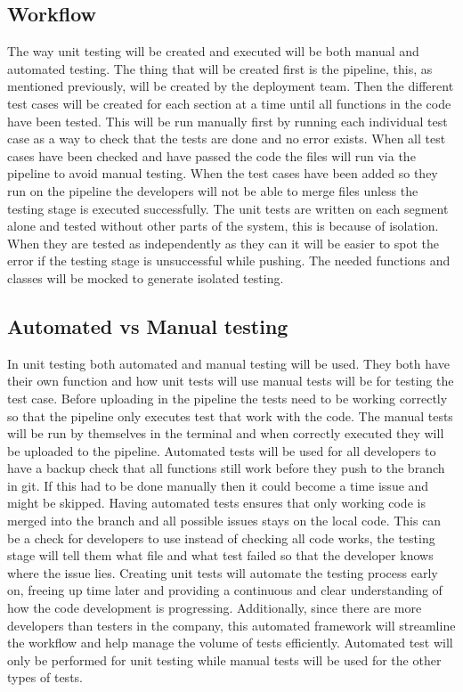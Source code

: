 \documentclass{article}
\begin{document}
\subsection{Workflow}
The way unit testing will be created and executed will be both manual and automated testing. The thing that will be created first is the pipeline, this, as mentioned previously, will be created by the deployment team. Then the different test cases will be created for each section at a time until all functions in the code have been tested. This will be run manually first by running each individual test case as a way to check that the tests are done and no error exists. When all test cases have been checked and have passed the code the files will run via the pipeline to avoid manual testing. When the test cases have been added so they run on the pipeline the developers will not be able to merge files unless the testing stage is executed successfully. The unit tests are written on each segment alone and tested without other parts of the system, this is because of isolation. When they are tested as independently as they can it will be easier to spot the error if the testing stage is unsuccessful while pushing. The needed functions and classes will be mocked to generate isolated testing. 

\subsection{Automated vs Manual testing }
In unit testing both automated and manual testing will be used. They both have their own function and how unit tests will use manual tests will be for testing the test case. Before uploading in the pipeline the tests need to be working correctly so that the pipeline only executes test that work with the code. The manual tests will be run by themselves in the terminal and when correctly executed they will be uploaded to the pipeline. Automated tests will be used for all developers to have a backup check that all functions still work before they push to the branch in git. If this had to be done manually then it could become a time issue and might be skipped. Having automated tests ensures that only working code is merged into the branch and all possible issues stays on the local code. This can be a check for developers to use instead of checking all code works, the testing stage will tell them what file and what test failed so that the developer knows where the issue lies. Creating unit tests will automate the testing process early on, freeing up time later and providing a continuous and clear understanding of how the code development is progressing. Additionally, since there are more developers than testers in the company, this automated framework will streamline the workflow and help manage the volume of tests efficiently. Automated test will only be performed for unit testing while manual tests will be used for the other types of tests. 
\end{document}
